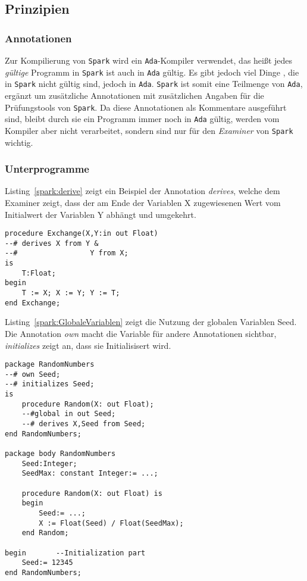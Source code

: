 \subsection{Prinzipien}
\label{subsec:Prinzipien}
\subsubsection{Annotationen}
\label{subsubsec:Annotationen}
Zur Kompilierung von \texttt{Spark} wird ein \texttt{Ada}-Kompiler verwendet, das heißt jedes \textit{gültige} Programm in \texttt{Spark} ist auch in \texttt{Ada} gültig. Es gibt jedoch viel Dinge , die in \texttt{Spark} nicht gültig sind, jedoch in \texttt{Ada}. \texttt{Spark} ist somit eine Teilmenge von \texttt{Ada}, ergänzt um zusätzliche Annotationen mit zusätzlichen Angaben für die Prüfungstools von \texttt{Spark}. Da diese Annotationen als Kommentare ausgeführt sind, bleibt durch sie ein Programm immer noch in \texttt{Ada} gültig, werden vom Kompiler aber nicht verarbeitet, sondern sind nur für den \textit{Examiner} von \texttt{Spark} wichtig.\\

\subsubsection{Unterprogramme}
\label{subsubsec:Unterprogramme}

Listing~\ref{spark:derive} zeigt ein Beispiel der Annotation \textit{derives}, welche dem Examiner zeigt, dass der am Ende der Variablen X zugewiesenen Wert vom Initialwert der Variablen Y abhängt und umgekehrt.
\begin{lstlisting}[caption={derive Beispiel}, label=spark:derive]
procedure Exchange(X,Y:in out Float)
--# derives X from Y &
--# 				Y from X;
is
	T:Float;
begin
	T := X; X := Y; Y := T;
end Exchange;
\end{lstlisting}

Listing~\ref{spark:GlobaleVariablen} zeigt die Nutzung der globalen Variablen Seed. Die Annotation \textit{own} macht die Variable für andere Annotationen sichtbar, \textit{initializes} zeigt an, dass sie Initialisisert wird.


\begin{lstlisting}[caption={Globale Variablen}, label=spark:GlobaleVariablen]
package RandomNumbers
--# own Seed;
--# initializes Seed;
is
	procedure Random(X: out Float);
	--#global in out Seed;
	--# derives X,Seed from Seed;
end RandomNumbers;

package body RandomNumbers
	Seed:Integer;
	SeedMax: constant Integer:= ...;
	
	procedure Random(X: out Float) is
	begin
		Seed:= ...;
		X := Float(Seed) / Float(SeedMax);
	end Random;
	
begin		--Initialization part
	Seed:= 12345
end RandomNumbers;
\end{lstlisting}
